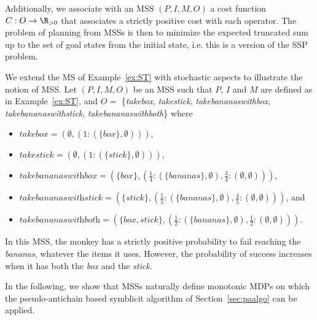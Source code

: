 \noindent
Additionally, we associate with an MSS $(P, I, M, O)$ a cost function $C : O \rightarrow \R_{> 0}$ that associates a strictly positive cost with each operator. The problem of planning from MSSs is then to minimize the expected truncated sum up to the set of goal states from the initial state, i.e. this is a version of the SSP problem.

\begin{example}\label{ex:mst}
We extend the MS of Example~\ref{ex:ST} with stochastic aspects to illustrate the notion of MSS. Let $(P, I, M, O)$ be an MSS such that $P$, $I$ and $M$ are defined as in Example~\ref{ex:ST}, and $O =$ \{\textit{takebox}, \textit{takestick}, \textit{takebananaswithbox}, \textit{takebananaswithstick}, \textit{takebananaswithboth}\} where 
\begin{itemize}
\item $\textit{takebox} = (\emptyset, (1 : (\{\textit{box}\}, \emptyset)))$,
\item $\textit{takestick} = (\emptyset, (1 : (\{\textit{stick}\}, \emptyset)))$,
\item $\textit{takebananaswithbox} = (\{\textit{box}\}, (\frac{1}{4}: (\{\textit{bananas}\}, \emptyset), \frac{3}{4}: (\emptyset, \emptyset)))$,
\item $\textit{takebananaswithstick} = (\{\textit{stick}\}, (\frac{1}{5}: (\{\textit{bananas}\}, \emptyset), \frac{4}{5}: (\emptyset, \emptyset)))$, and 
\item $\textit{takebananaswithboth} = (\{\textit{box}, \textit{stick}\}, (\frac{1}{2}: (\{\textit{bananas}\}, \emptyset), \frac{1}{2}: (\emptyset, \emptyset)))$.
\end{itemize}
In this MSS, the monkey has a strictly positive probability to fail reaching the \textit{bananas}, whatever the items it uses. However, the probability of success increases when it has both the \textit{box} and the \textit{stick}.
\end{example}

In the following, we show that MSSs naturally define monotonic MDPs on which the pseudo-antichain based symblicit algorithm of Section~\ref{sec:paalgo} can be applied.

